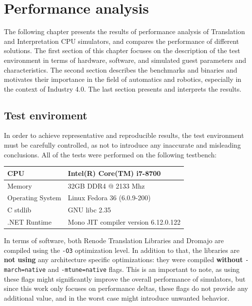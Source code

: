 \chapter{Performance analysis}

The following chapter presents the results of performance analysis of Translation and Interpretation CPU simulators,
and compares the performance of different solutions. The first section of this chapter focuses
on the description of the test environment in terms of hardware, software, and simulated guest parameters and
characteristics. The second section describes the benchmarks and binaries and motivates their importance in the field
of automatics and robotics, especially in the context of Industry 4.0. The last section presents and interprets
the results.

\section{Test enviroment}
In order to achieve representative and reproducible results, the test environment must be carefully controlled, as not
to introduce any inaccurate and misleading conclusions. All of the tests were performed on the following testbench:

\begin{table}[h!]
    \centering
    \begin{tabular}{l|l}
    CPU              & Intel(R) Core(TM) i7-8700             \\
    \hline
    Memory           & 32GB DDR4 @ 2133 Mhz                  \\
    \hline
    Operating System & Linux Fedora 36 (6.0.9-200)           \\
    \hline
    C stdlib         & GNU libc 2.35                         \\
    \hline
    .NET Runtime     & Mono JIT compiler version 6.12.0.122
    \end{tabular}
\end{table}

\noindent
In terms of software, both Renode Translation Libraries and Dromajo are compiled using the \texttt{-O3} optimization
level. In addition to that, the libraries are \textbf{not using} any architecture specific optimizations:
they were compiled \textbf{without} \texttt{-march=native} and \texttt{-mtune=native} flags. This is an important
to note, as using these flags might significantly improve the overall performance of simulators, but since
this work only focuses on performance deltas, these flags do not provide any additional value, and in the worst
case might introduce unwanted behavior.

